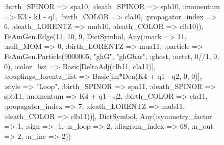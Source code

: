 \documentclass{revtex4}
\begin{document}
\begin{figure}[!htb]
\begin{center}
{:birth_SPINOR => spa10, :death_SPINOR => spb10, :momentum => K3 - k1 - q1, :birth_COLOR => cla10, :propagator_index => 6, :death_LORENTZ => mub10, :death_COLOR => clb10)), FeAmGen.Edge(11, 10, 9, Dict{Symbol, Any}(:mark => 11, :null_MOM => 0, :birth_LORENTZ => mua11, :particle => FeAmGen.Particle(9000005, "ghG", "ghGbar", :ghost, :octet, 0//1, 0, 0), :color_list => Basic[DeltaAdj(clb11, cla11)], :couplings_lorentz_list => Basic[im*Den(K4 + q1 - q2, 0, 0)], :style => "Loop", :birth_SPINOR => spa11, :death_SPINOR => spb11, :momentum => K4 + q1 - q2, :birth_COLOR => cla11, :propagator_index => 7, :death_LORENTZ => mub11, :death_COLOR => clb11))], Dict{Symbol, Any}(:symmetry_factor => 1, :sign => -1, :n_loop => 2, :diagram_index => 68, :n_out => 2, :n_inc => 2)) 
}
\end{center}
\end{figure}
\end{document}
